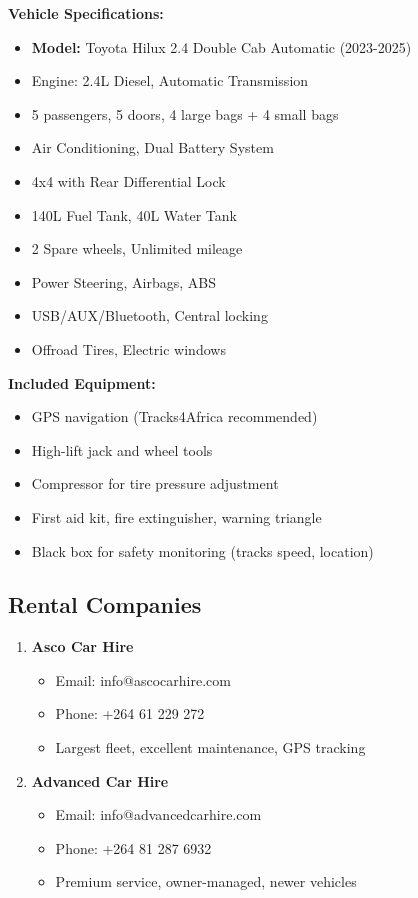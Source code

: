 \documentclass[11pt]{article}
\begin{document}
\textbf{Vehicle Specifications:}
\begin{itemize}
    \item \textbf{Model:} Toyota Hilux 2.4 Double Cab Automatic (2023-2025)
    \item Engine: 2.4L Diesel, Automatic Transmission
    \item 5 passengers, 5 doors, 4 large bags + 4 small bags
    \item Air Conditioning, Dual Battery System
    \item 4x4 with Rear Differential Lock
    \item 140L Fuel Tank, 40L Water Tank
    \item 2 Spare wheels, Unlimited mileage
    \item Power Steering, Airbags, ABS
    \item USB/AUX/Bluetooth, Central locking
    \item Offroad Tires, Electric windows
\end{itemize}

\textbf{Included Equipment:}
\begin{itemize}
    \item GPS navigation (Tracks4Africa recommended)
    \item High-lift jack and wheel tools
    \item Compressor for tire pressure adjustment
    \item First aid kit, fire extinguisher, warning triangle
    \item Black box for safety monitoring (tracks speed, location)
\end{itemize}

\subsection{Rental Companies}

\begin{enumerate}
    \item \textbf{Asco Car Hire}
    \begin{itemize}
        \item Email: info@ascocarhire.com
        \item Phone: +264 61 229 272
        \item Largest fleet, excellent maintenance, GPS tracking
    \end{itemize}

    \item \textbf{Advanced Car Hire}
    \begin{itemize}
        \item Email: info@advancedcarhire.com
        \item Phone: +264 81 287 6932
        \item Premium service, owner-managed, newer vehicles
    \end{itemize}
\end{enumerate}
\end{document}
